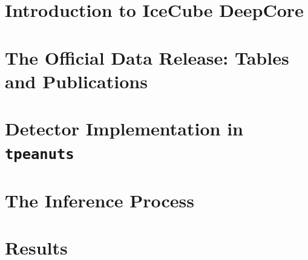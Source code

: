 \documentclass[11pt,a4paper,openany]{report}
\begin{document}
\tableofcontents
{}
\clearpage
{}

\chapter{Introduction to IceCube DeepCore}


\chapter{The Official Data Release: Tables and Publications}


\chapter{Detector Implementation in \texttt{tpeanuts}}


\chapter{The Inference Process}


\chapter{Results}


\clearpage
\printbibliography[title={References}]
\end{document}
